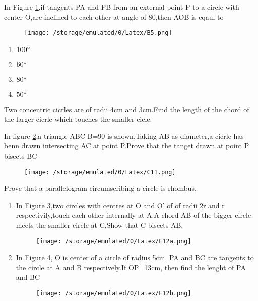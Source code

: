 \documentclass[12pt]{exam}
\author{saikiran}
\begin{document}
\begin{questions}
\question 
	In Figure \ref{fig:1},if tangents PA and PB from an external point P to a circle with center O,are inclined to each other at angle of 80\degree,then \angle AOB is eqaul to
\begin{figure}[H]
	\centering
	\texttt{[image: /storage/emulated/0/Latex/B5.png]}
	\caption{}
	\label{fig:1}
\end{figure}
\begin{enumerate}
	\item $100\degree$
	\item $60\degree$
	\item $80\degree$
	\item $50\degree$
\end{enumerate}

\question 
Two concentric cicrles are of radii 4cm and 3cm.Find the length of the chord of the larger cicrle which touches the smaller cicle.

\question
	In figure \ref{fig:2},a triangle ABC \angle B=90 \degree is shown.Taking AB as diameter,a cicrle has benn drawn intersecting AC at point P.Prove that  the tanget drawn at point P bisects BC
\begin{figure}[H]
\centering
\texttt{[image: /storage/emulated/0/Latex/C11.png]}
	\caption{}
	\label{fig:2}
\end{figure}
\question 
Prove that a parallelogram circumscribing a circle is rhombus.

\question 
\begin{enumerate}

	\item In Figure \ref{fig:3},two circles with centres at O and O' of of radii 2r and r respectivily,touch each other internally at A.A chord AB of the bigger circle meets the smaller circle at C,Show that C bisects AB.
	\begin{figure}[H]
		\centering
		\texttt{[image: /storage/emulated/0/Latex/E12a.png]}
		\caption{}
		\label{fig:3}
	\end{figure}

	\item In Figure \ref{fig:4}, O is center of a circle of radius 5cm. PA and BC are tangents to the circle at A and B respectively.If OP=13cm, then find the lenght of PA and BC 
	\begin{figure}[H]
		\centering
		\texttt{[image: /storage/emulated/0/Latex/E12b.png]}
		\caption{}
		\label{fig:4}
\end{figure}
\end{enumerate}


\end{questions}
\end{document}
